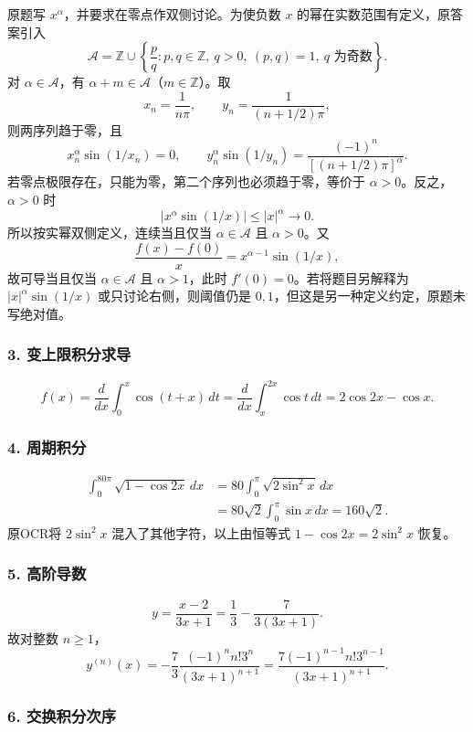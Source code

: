 \documentclass[11pt,fontset=fandol]{ctexart}
\begin{document}
原题写 \(x^\alpha\)，并要求在零点作双侧讨论。为使负数 \(x\)
的幂在实数范围有定义，原答案引入 \[
\mathcal A=\mathbb Z\cup\left\{\frac pq:p,q\in\mathbb Z,\ q>0,\ (p,q)=1,\ q\text{ 为奇数}\right\}.
\] 对 \(\alpha\in\mathcal A\)，有
\(\alpha+m\in\mathcal A\)（\(m\in\mathbb Z\)）。取 \[
x_n=\frac1{n\pi},\qquad y_n=\frac1{(n+1/2)\pi},
\] 则两序列趋于零，且 \[
x_n^\alpha\sin(1/x_n)=0,\qquad
y_n^\alpha\sin(1/y_n)=\frac{(-1)^n}{[(n+1/2)\pi]^\alpha}.
\] 若零点极限存在，只能为零，第二个序列也必须趋于零，等价于
\(\alpha>0\)。反之，\(\alpha>0\) 时 \[
|x^\alpha\sin(1/x)|\le|x|^\alpha\to0.
\] 所以按实幂双侧定义，连续当且仅当 \(\alpha\in\mathcal A\) 且
\(\alpha>0\)。又 \[
\frac{f(x)-f(0)}x=x^{\alpha-1}\sin(1/x),
\] 故可导当且仅当 \(\alpha\in\mathcal A\) 且 \(\alpha>1\)，此时
\(f'(0)=0\)。若将题目另解释为 \(|x|^\alpha\sin(1/x)\)
或只讨论右侧，则阈值仍是 \(0,1\)，但这是另一种定义约定，原题未写绝对值。

\subsubsection{3.
变上限积分求导}\label{ux53d8ux4e0aux9650ux79efux5206ux6c42ux5bfc}

\[
f(x)=\frac d{dx}\int_0^x\cos(t+x)\,dt
=\frac d{dx}\int_x^{2x}\cos t\,dt=2\cos2x-\cos x.
\]

\subsubsection{4. 周期积分}\label{ux5468ux671fux79efux5206}

\[
\begin{aligned}
\int_0^{80\pi}\sqrt{1-\cos2x}\,dx
&=80\int_0^\pi\sqrt{2\sin^2x}\,dx\\
&=80\sqrt2\int_0^\pi\sin x\,dx=160\sqrt2.
\end{aligned}
\] 原OCR将 \(2\sin^2x\) 混入了其他字符，以上由恒等式
\(1-\cos2x=2\sin^2x\) 恢复。

\subsubsection{5. 高阶导数}\label{ux9ad8ux9636ux5bfcux6570}

\[
y=\frac{x-2}{3x+1}=\frac13-\frac7{3(3x+1)}.
\] 故对整数 \(n\ge1\)， \[
y^{(n)}(x)=-\frac73\frac{(-1)^nn!3^n}{(3x+1)^{n+1}}
=\frac{7(-1)^{n-1}n!3^{n-1}}{(3x+1)^{n+1}}.
\]

\subsubsection{6.
交换积分次序}\label{ux4ea4ux6362ux79efux5206ux6b21ux5e8f}
\end{document}
